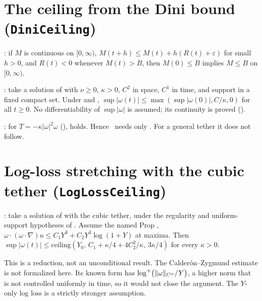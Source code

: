 \documentclass[11pt]{article}
\begin{document}
\section{The ceiling from the Dini bound (\texttt{DiniCeiling})}
\begin{theorem}\coined: if $M$ is continuous on $[0,\infty)$, $M(t+h)\le M(t)+h(R(t)+\varepsilon)$ for small $h>0$, and $R(t)<0$ whenever $M(t)>B$, then $M(0)\le B$ implies $M\le B$ on $[0,\infty)$.\end{theorem}
\begin{theorem}\coined: take a solution of  with $\nu\ge0$, $\kappa>0$, $C^2$ in space, $C^1$ in time, and support in a fixed compact set. Under  and , $\sup|\omega(t)|\le\max(\sup|\omega(0)|,C/\kappa,0)$ for all $t\ge0$. No differentiability of $\sup|\omega|$ is assumed; its continuity is proved (\coined).\end{theorem}
\begin{theorem}\coined: for $T=-\kappa|\omega|^2\omega$ (\coined),  holds. Hence \coined\ needs only . For a general tether it does not follow.\end{theorem}
\section{Log-loss stretching with the cubic tether (\texttt{LogLossCeiling})}
\begin{theorem}\coined: take a solution of  with the cubic tether, under the regularity and uniform-support hypotheses of . Assume the named Prop \coined, $\omega\cdot(\omega\cdot\nabla)u\le C_1Y^3+C_2Y^3\log(1+Y)$ at maxima. Then $\sup|\omega(t)|\le\mathrm{ceiling}(Y_0,\,C_1+\kappa/4+4C_2^2/\kappa,\,3\kappa/4)$ for every $\kappa>0$.\end{theorem}
This is a reduction, not an unconditional result. The Calder\'on--Zygmund estimate is not formalized here. Its known form has $\log^+\bigl(\lVert\omega\rVert_{C^\alpha}/Y\bigr)$, a higher norm that is not controlled uniformly in time, so it would not close the argument. The $Y$-only log loss is a strictly stronger assumption.
\end{document}
